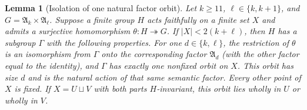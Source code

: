 \documentclass[11pt,a4paper]{article}
\newtheorem{lemma}[theorem]{Lemma}
\theoremstyle{definition}
\theoremstyle{remark}
\newcommand{\Alt}{\mathfrak A}
\begin{document}
\begin{lemma}[Isolation of one natural factor orbit]\label{lem:isolation}
Let $k\ge11$, $\ell\in\{k,k+1\}$, and $G=\Alt_k\times\Alt_\ell$.
Suppose a finite group $H$ acts faithfully on a finite set $X$ and
admits a surjective homomorphism $\theta:H\twoheadrightarrow G$.
If $|X|<2(k+\ell)$, then $H$ has a subgroup $\Gamma$ with the following
properties. For one $d\in\{k,\ell\}$, the restriction of $\theta$ is
an isomorphism from $\Gamma$ onto the corresponding factor $\Alt_d$
(with the other factor equal to the identity), and $\Gamma$ has exactly
one nonfixed orbit on $X$. This orbit has size $d$ and is the natural
action of that same semantic factor. Every other point of $X$ is fixed.
If $X=U\sqcup V$ with both parts $H$-invariant, this orbit lies wholly
in $U$ or wholly in $V$.
\end{lemma}
\end{document}
